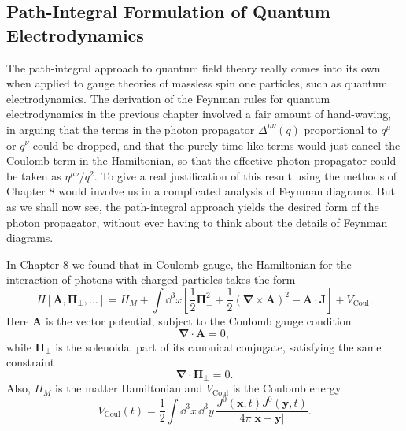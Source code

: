 
\subsection{Path-Integral Formulation of Quantum Electrodynamics}

The path-integral approach to quantum field theory really comes into its own
when applied to gauge theories of massless spin one particles, such as quantum
electrodynamics. The derivation of the Feynman rules for quantum
electrodynamics in the previous chapter involved a fair amount of hand-waving,
in arguing that the terms in the photon propagator $\Delta^{\mu\nu}(q)$
proportional to $q^\mu$ or $q^\nu$ could be dropped, and that the purely
time-like terms would just cancel the Coulomb term in the Hamiltonian, so that
the effective photon propagator could be taken as $\eta^{\mu\nu}/q^2$. To give
a real justification of this result using the methods of Chapter 8 would
involve us in a complicated analysis of Feynman diagrams. But as we shall now
see, the path-integral approach yields the desired form of the photon
propagator, without ever having to think about the details of Feynman diagrams.

In Chapter 8 we found that in Coulomb gauge, the Hamiltonian for the interaction
of photons with charged particles takes the form
\begin{equation}
H[\mathbf A,\boldsymbol\Pi_\perp,\ldots]
=H_M+\int \dd^3x\left[\frac12\boldsymbol\Pi_\perp^2
 +\frac12(\boldsymbol\nabla\times\mathbf A)^2-\mathbf A\cdot\mathbf J\right]
 +V_{\mathrm{Coul}}.
\tag{9.6.1}\label{eq:9.6.1}
\end{equation}
Here $\mathbf A$ is the vector potential, subject to the Coulomb gauge condition
\begin{equation}
\boldsymbol\nabla\cdot\mathbf A=0,
\tag{9.6.2}\label{eq:9.6.2}
\end{equation}
while $\boldsymbol\Pi_\perp$ is the solenoidal part of its canonical conjugate,
satisfying the same constraint
\begin{equation}
\boldsymbol\nabla\cdot\boldsymbol\Pi_\perp=0.
\tag{9.6.3}\label{eq:9.6.3}
\end{equation}
Also, $H_M$ is the matter Hamiltonian and $V_{\mathrm{Coul}}$ is the Coulomb
energy
\begin{equation}
V_{\mathrm{Coul}}(t)=\frac12\int \dd^3x\,\dd^3y\,
 \frac{J^0(\mathbf{x},t)J^0(\mathbf{y},t)}{4\pi|\mathbf{x}-\mathbf{y}|}.
\tag{9.6.4}\label{eq:9.6.4}
\end{equation}


